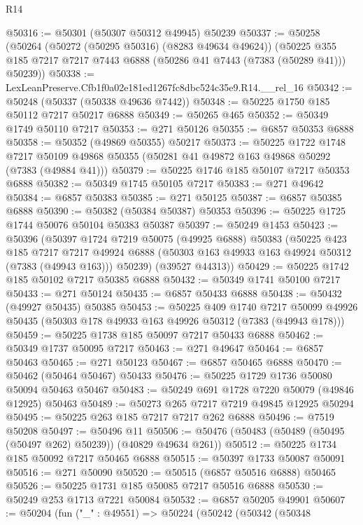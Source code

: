 \begin{lexlean}{R14}
\begin{coremodule}
@50316 := @50301 (@50307 @50312 @49945) @50239
@50337 := @50258
    (@50264
      (@50272 (@50295 @50316) (@8283 @49634 @49624))
      (@50225 @355 @185 @7217 @7217 @7443 @6888 (@50286 @41 @7443 (@7383 (@50289 @41))) @50239))
@50338 := LexLeanPreserve.Cfb1f0a02e181ed1267fc8dbc524c35e9.R14.__rel_16
@50342 := @50248 (@50337 (@50338 @49636 @7442))
@50348 := @50225 @1750 @185 @50112 @7217 @50217 @6888
@50349 := @50265 @465
@50352 := @50349 @1749 @50110 @7217
@50353 := @271 @50126
@50355 := @6857 @50353 @6888
@50358 := @50352 (@49869 @50355) @50217
@50373 := @50225
    @1722
    @1748
    @7217
    @50109
    @49868
    @50355
    (@50281 @41 @49872 @163 @49868 @50292 (@7383 (@49884 @41)))
@50379 := @50225 @1746 @185 @50107 @7217 @50353 @6888
@50382 := @50349 @1745 @50105 @7217
@50383 := @271 @49642
@50384 := @6857 @50383
@50385 := @271 @50125
@50387 := @6857 @50385 @6888
@50390 := @50382 (@50384 @50387) @50353
@50396 := @50225 @1725 @1744 @50076 @50104 @50383 @50387
@50397 := @50249 @1453
@50423 := @50396
    (@50397
      @1724
      @7219
      @50075
      (@49925 @6888)
      @50383
      (@50225
        @423
        @185
        @7217
        @7217
        @49924
        @6888
        (@50303 @163 @49933 @163 @49924 @50312 (@7383 (@49943 @163)))
        @50239)
      (@39527 @44313))
@50429 := @50225 @1742 @185 @50102 @7217 @50385 @6888
@50432 := @50349 @1741 @50100 @7217
@50433 := @271 @50124
@50435 := @6857 @50433 @6888
@50438 := @50432 (@49927 @50435) @50385
@50453 := @50225
    @409
    @1740
    @7217
    @50099
    @49926
    @50435
    (@50303 @178 @49933 @163 @49926 @50312 (@7383 (@49943 @178)))
@50459 := @50225 @1738 @185 @50097 @7217 @50433 @6888
@50462 := @50349 @1737 @50095 @7217
@50463 := @271 @49647
@50464 := @6857 @50463
@50465 := @271 @50123
@50467 := @6857 @50465 @6888
@50470 := @50462 (@50464 @50467) @50433
@50476 := @50225 @1729 @1736 @50080 @50094 @50463 @50467
@50483 := @50249 @691 @1728 @7220 @50079 (@49846 @12925) @50463
@50489 := @50273 @265 @7217 @7219 @49845 @12925 @50294
@50495 := @50225 @263 @185 @7217 @7217 @262 @6888
@50496 := @7519 @50208
@50497 := @50496 @11
@50506 := @50476 (@50483 (@50489 (@50495 (@50497 @262) @50239)) (@40829 @49634 @261))
@50512 := @50225 @1734 @185 @50092 @7217 @50465 @6888
@50515 := @50397 @1733 @50087 @50091
@50516 := @271 @50090
@50520 := @50515 (@6857 @50516 @6888) @50465
@50526 := @50225 @1731 @185 @50085 @7217 @50516 @6888
@50530 := @50249 @253 @1713 @7221 @50084
@50532 := @6857 @50205 @49901
@50607 := @50204
    (fun ("_" : @49551) =>
    @50224
      (@50242
        (@50342
          (@50348

\end{coremodule}
\end{lexlean}
